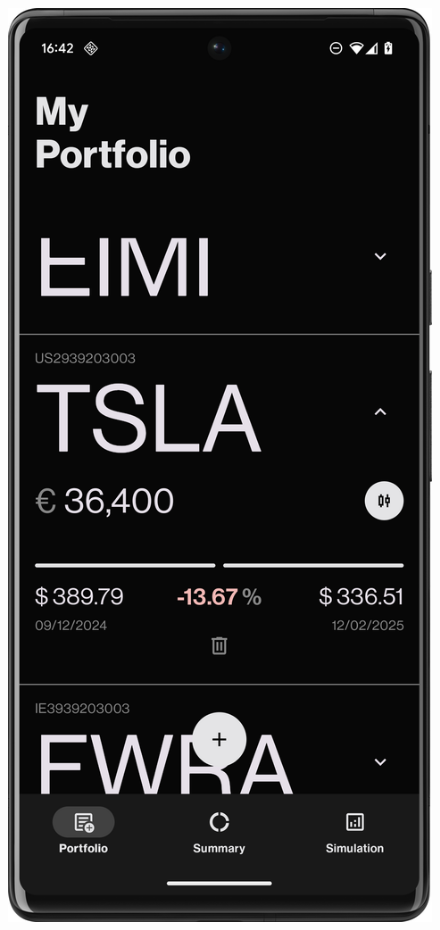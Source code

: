 \begin{figure}[H]
\begin{minipage}{0.24\textwidth}
        \label{fig:cash_card}
    \end{minipage}
    \hfill
    \begin{minipage}{0.24\textwidth}
        \centering
        \includegraphics[width=\textwidth]{foto/product_card}

\end{minipage}
\end{figure}
